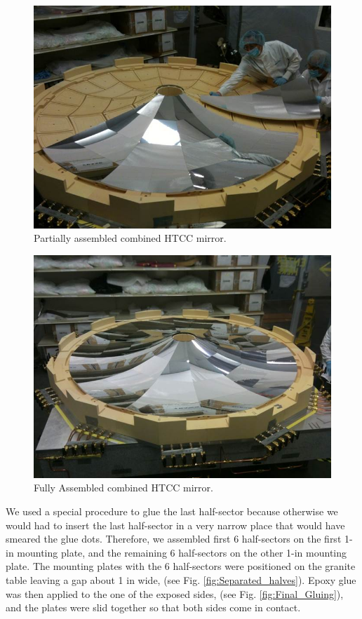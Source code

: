  
\begin{figure}[ht]
    \centering
    \includegraphics[width=1.0\linewidth]{images/Partial_Assembl_MIR.jpg}
    \caption{ Partially assembled combined HTCC mirror.}
    \label{fig:Partial_Assembl_MIR}
\end{figure}

 \begin{figure}[ht]
    \centering
    \includegraphics[width=1.0\linewidth]{images/Compl_Assembl_MIR.jpg}
    \caption{Fully Assembled combined HTCC mirror.}
    \label{fig:Compl_Assembl_MIR}
\end{figure}

 We used a special procedure to glue the last half-sector because otherwise we would had to insert the last half-sector in a very narrow place that would have smeared the glue dots. Therefore, we assembled first 6 half-sectors on the first 1-in mounting plate, and the remaining 6 half-sectors on the other 1-in mounting plate. The mounting plates with the 6 half-sectors were positioned on the granite table leaving a gap about 1 in wide, (see Fig. \ref{fig:Separated_halves}). Epoxy glue was then applied to the one of the exposed sides, (see Fig. \ref{fig:Final_Gluing}), and the plates were slid together so that both sides come in contact.
 
